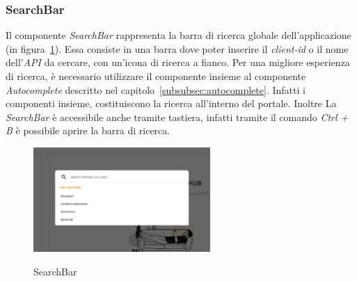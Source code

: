 \subsubsection{SearchBar}\label{subsubsec:search-bar}
Il componente \textit{SearchBar} rappresenta la barra di ricerca globale dell'applicazione (in figura~\ref{fig:search-bar}). 
Essa consiste in una barra dove poter inserire il \textit{client-id} o il nome dell'\textit{API} da cercare,
con un'icona di ricerca a fianco. Per una migliore esperienza di ricerca, è necessario utilizzare il componente insieme al componente \textit{Autocomplete} descritto nel capitolo~\ref{subsubsec:autocomplete}.
Infatti i componenti insieme, costituiscono la ricerca all'interno del portale. Inoltre La \textit{SearchBar} è accessibile anche tramite tastiera,
infatti tramite il comando \textit{Ctrl + B} è possibile aprire la barra di ricerca.\\

\begin{figure}[ht]
  \centering
  \includegraphics[width=0.6\textwidth, alt={Barra di ricerca globale dell'applicazione}]{images/frontend/SearchBar.jpg}
  \caption{SearchBar}\label{fig:search-bar}
\end{figure}
\pagebreak

